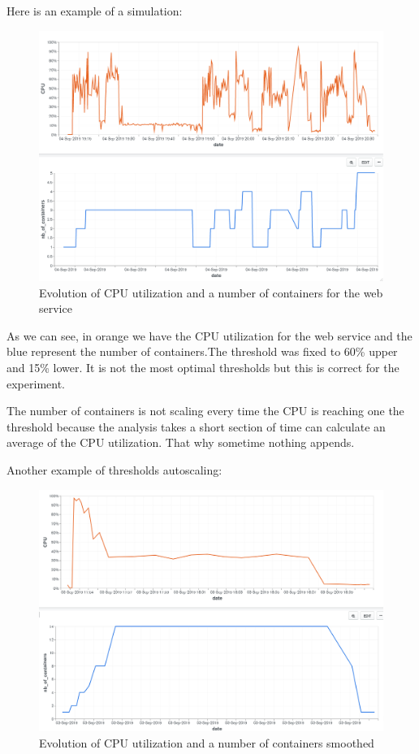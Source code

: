 \documentclass[11pt]{IEEEtran}
\begin{document}
Here is an example of a simulation:
\begin{figure}[h]
 \centerline{\includegraphics[width=\linewidth]{threshold.png}}
 \caption{Evolution of CPU utilization and a number of containers for the web service}
\end{figure}

As we can see, in orange we have the CPU utilization for the web service and the blue represent the number of containers.The threshold was fixed to 60\% upper and 15\% lower. It is not the most optimal thresholds but this is correct for the experiment. 

The number of containers is not scaling every time the CPU is reaching one the threshold because the analysis takes a short section of time can calculate an average of the CPU utilization. That why sometime nothing appends.

Another example of thresholds autoscaling:
\begin{figure}[h]
 \centerline{\includegraphics[width=\linewidth]{diagram_smoothed.png}}
 \caption{Evolution of CPU utilization and a number of containers smoothed}
\end{figure}
\end{document}
